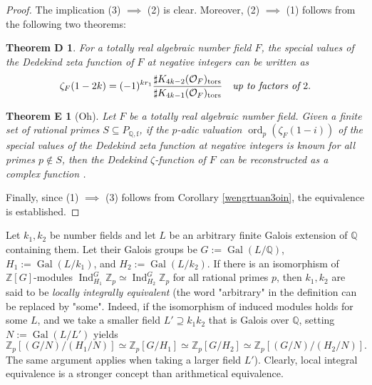 \documentclass{article}
\numberwithin{equation}{section} %
\newtheorem*{themD}{Theorem D}
\newtheorem*{themE}{Theorem E}
\begin{document}
\begin{proof}
  The implication (3) $\implies$ (2) is clear. Moreover, (2) $\implies$ (1) follows from the following two theorems:
      
  \begin{themD}
    For a totally real algebraic number field $F$, the special values of the Dedekind zeta function of $F$ at negative integers can be written as
    \[
      \zeta_F(1-2k) = (-1)^{kr_1}\frac{\sharp K_{4k-2}(\mathcal{O}_F)_{\rm tors}}{\sharp K_{4k - 1}(\mathcal{O}_F)_{\rm tors}} \quad \textit{up to factors of} \ 2.
    \]
    \cite[Theorem 77]{Weibel3}
  \end{themD}
  \begin{themE}[Oh]
    Let $F$ be a totally real algebraic number field. Given a finite set of rational primes $S \subseteq P_{\mathbb{Q},\mathrm{f}}$, if the $p$-adic valuation $\operatorname{ord}_p(\zeta_F(1-i))$ of the special values of the Dedekind zeta function at negative integers is known for all primes $p \notin S$, then the Dedekind $\zeta$-function of $F$ can be reconstructed as a complex function \cite[Section 3]{Oh}.
  \end{themE}

  Finally, since (1) $\implies$ (3) follows from Corollary \ref{wengrtuan3oin}, the equivalence is established.
\end{proof}


    Let $k_1, k_2$ be number fields and let $L$ be an arbitrary finite Galois extension of $\mathbb{Q}$ containing them. Let their Galois groups be $G := \operatorname{Gal}(L/\mathbb{Q})$, $H_1 := \operatorname{Gal}(L/k_1)$, and $H_2 := \operatorname{Gal}(L/k_2)$. If there is an isomorphism of $\mathbb{Z}[G]$-modules $\operatorname{Ind}_{H_1}^G \mathbb{Z}_p \simeq \operatorname{Ind}_{H_2}^G\mathbb{Z}_p$ for all rational primes $p$, then $k_1, k_2$ are said to be \textit{locally integrally equivalent} \cite[Definition 3.2]{Sutherland} (the word "arbitrary" in the definition can be replaced by "some". Indeed, if the isomorphism of induced modules holds for some $L$, and we take a smaller field $L' \supseteq k_1k_2$ that is Galois over $\mathbb{Q}$, setting $N := \operatorname{Gal}(L/L')$ yields
\[
  \mathbb{Z}_p[(G/N)/(H_1/N)] \simeq \mathbb{Z}_p[G/H_1] \simeq \mathbb{Z}_p[G/H_2] \simeq \mathbb{Z}_p[(G/N)/(H_2/N)].
\]
The same argument applies when taking a larger field $L'$). Clearly, local integral equivalence is a stronger concept than arithmetical equivalence.
\end{document}
